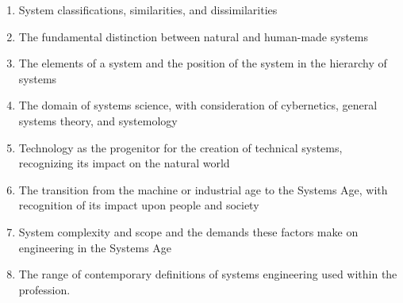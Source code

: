 \begin{enumerate}
\item System classifications, similarities, and dissimilarities
\item The fundamental distinction between natural and human-made systems
\item The elements of a system and the position of the system in the hierarchy of systems
\item The domain of systems science, with consideration of cybernetics, general systems theory, and systemology
\item Technology as the progenitor for the creation of technical systems, recognizing its impact on the natural world
\item The transition from the machine or industrial age to the Systems Age, with recognition of its impact upon people and society
\item System complexity and scope and the demands these factors make on engineering in the Systems Age
\item The range of contemporary definitions of systems engineering used within the profession.
\end{enumerate}